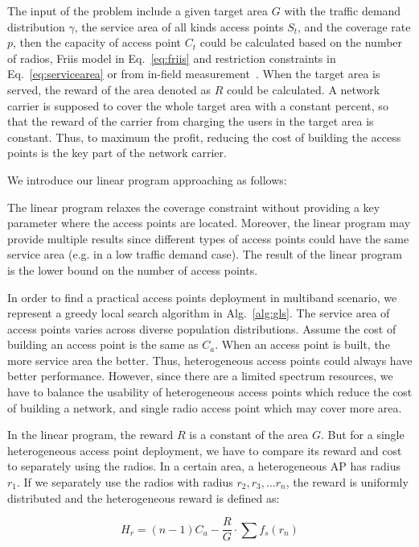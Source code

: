 The input of the problem include a given target area $G$ with the traffic demand distribution $\gamma$, 
the service area of all kinds access points $S_t$, and the coverage rate $p$, then the capacity of access 
point $C_t$ could be calculated based on the number of radios, Friis model in Eq.~\ref{eq:friis} 
and restriction constraints in Eq.~\ref{eq:servicearea} or from in-field measurement~\cite{cuileveraging}. 
When the target area is served, the reward of the area denoted as $R$ could be calculated. 
A network carrier is supposed to cover the whole target area with a constant percent, so that the reward 
of the carrier from charging the users in the target area is constant. Thus, to maximum the profit, 
reducing the cost of building the access points is the key part of the network
carrier. 

We introduce our linear program approaching as follows:



The linear program relaxes the coverage constraint without providing a key parameter where the access 
points are located. Moreover, the linear program may provide multiple results since different types of 
access points could have the same service area (e.g. in a low traffic demand case). The result of the 
linear program is the lower bound on the number of access points. 

In order to find a practical access points deployment in multiband scenario, we represent 
a greedy local search algorithm in Alg.~\ref{alg:gls}. The service area of access points varies 
across diverse population distributions. Assume the cost of building an access point is the same as $C_a$. 
When an access point is built, the more service area the better. Thus, heterogeneous access points
could always have better performance. However, since there are a limited spectrum resources,
we have to balance the usability of heterogeneous access points which reduce the cost of building 
a network, and single radio access point which may cover more area.

In the linear program, the reward $R$ is a constant of the area $G$. But for a single heterogeneous 
access point deployment, we have to compare its reward and cost to separately using the radios. In a 
certain area, a heterogeneous AP has radius $r_1$. If we separately use the radios with radius $r_2,r_3,\dots r_n$, 
the reward is uniformly distributed and the heterogeneous reward is defined as:

\begin{equation}
\label{eq:unitprice}
H_r=(n-1) C_a - \frac{R}{G}\cdot\sum f_s(r_n)
\end{equation}

